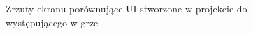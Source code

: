 \documentclass{SGGW-thesis}
\begin{document}
\begin{figure}[H]
  \hfill
  \hfill
  \hfill
  \caption{Zrzuty ekranu porównujące UI stworzone w projekcie do występującego w grze \cite{SMT3}}
\end{figure}
\end{document}
